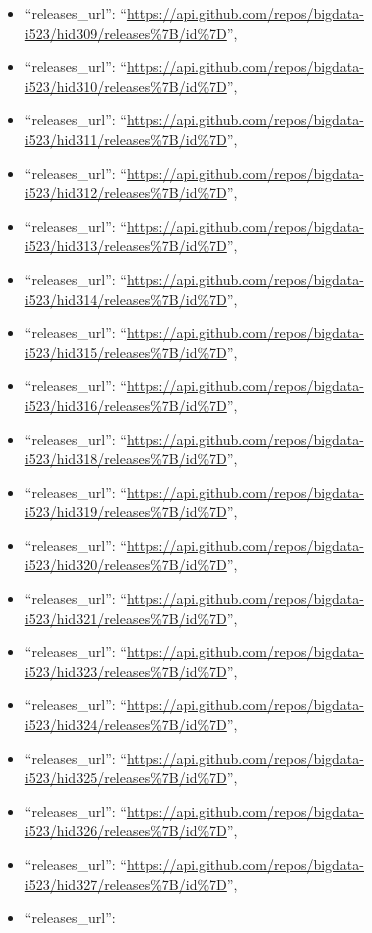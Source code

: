 \begin{itemize}
\item
  ``releases\_url'':
  ``\url{https://api.github.com/repos/bigdata-i523/hid309/releases\%7B/id\%7D}'',
\item
  ``releases\_url'':
  ``\url{https://api.github.com/repos/bigdata-i523/hid310/releases\%7B/id\%7D}'',
\item
  ``releases\_url'':
  ``\url{https://api.github.com/repos/bigdata-i523/hid311/releases\%7B/id\%7D}'',
\item
  ``releases\_url'':
  ``\url{https://api.github.com/repos/bigdata-i523/hid312/releases\%7B/id\%7D}'',
\item
  ``releases\_url'':
  ``\url{https://api.github.com/repos/bigdata-i523/hid313/releases\%7B/id\%7D}'',
\item
  ``releases\_url'':
  ``\url{https://api.github.com/repos/bigdata-i523/hid314/releases\%7B/id\%7D}'',
\item
  ``releases\_url'':
  ``\url{https://api.github.com/repos/bigdata-i523/hid315/releases\%7B/id\%7D}'',
\item
  ``releases\_url'':
  ``\url{https://api.github.com/repos/bigdata-i523/hid316/releases\%7B/id\%7D}'',
\item
  ``releases\_url'':
  ``\url{https://api.github.com/repos/bigdata-i523/hid318/releases\%7B/id\%7D}'',
\item
  ``releases\_url'':
  ``\url{https://api.github.com/repos/bigdata-i523/hid319/releases\%7B/id\%7D}'',
\item
  ``releases\_url'':
  ``\url{https://api.github.com/repos/bigdata-i523/hid320/releases\%7B/id\%7D}'',
\item
  ``releases\_url'':
  ``\url{https://api.github.com/repos/bigdata-i523/hid321/releases\%7B/id\%7D}'',
\item
  ``releases\_url'':
  ``\url{https://api.github.com/repos/bigdata-i523/hid323/releases\%7B/id\%7D}'',
\item
  ``releases\_url'':
  ``\url{https://api.github.com/repos/bigdata-i523/hid324/releases\%7B/id\%7D}'',
\item
  ``releases\_url'':
  ``\url{https://api.github.com/repos/bigdata-i523/hid325/releases\%7B/id\%7D}'',
\item
  ``releases\_url'':
  ``\url{https://api.github.com/repos/bigdata-i523/hid326/releases\%7B/id\%7D}'',
\item
  ``releases\_url'':
  ``\url{https://api.github.com/repos/bigdata-i523/hid327/releases\%7B/id\%7D}'',
\item
  ``releases\_url'':

\end{itemize}
